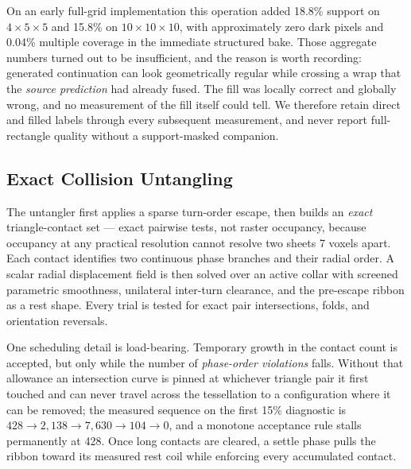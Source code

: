 On an early full-grid implementation this operation added 18.8\% support on $4\times5\times5$ and 15.8\% on $10\times10\times10$, with approximately zero dark pixels and 0.04\% multiple coverage in the immediate structured bake. Those aggregate numbers turned out to be insufficient, and the reason is worth recording: generated continuation can look geometrically regular while crossing a wrap that the \emph{source prediction} had already fused. The fill was locally correct and globally wrong, and no measurement of the fill itself could tell. We therefore retain direct and filled labels through every subsequent measurement, and never report full-rectangle quality without a support-masked companion.

\subsection{Exact Collision Untangling}
\label{sec:untangle}


The untangler first applies a sparse turn-order escape, then builds an \emph{exact} triangle-contact set --- exact pairwise tests, not raster occupancy, because occupancy at any practical resolution cannot resolve two sheets 7 voxels apart. Each contact identifies two continuous phase branches and their radial order. A scalar radial displacement field is then solved over an active collar with screened parametric smoothness, unilateral inter-turn clearance, and the pre-escape ribbon as a rest shape. Every trial is tested for exact pair intersections, folds, and orientation reversals.

One scheduling detail is load-bearing. Temporary growth in the contact count is accepted, but only while the number of \emph{phase-order violations} falls. Without that allowance an intersection curve is pinned at whichever triangle pair it first touched and can never travel across the tessellation to a configuration where it can be removed; the measured sequence on the first 15\% diagnostic is $428\rightarrow2{,}138\rightarrow7{,}630\rightarrow104\rightarrow0$, and a monotone acceptance rule stalls permanently at 428. Once long contacts are cleared, a settle phase pulls the ribbon toward its measured rest coil while enforcing every accumulated contact.

